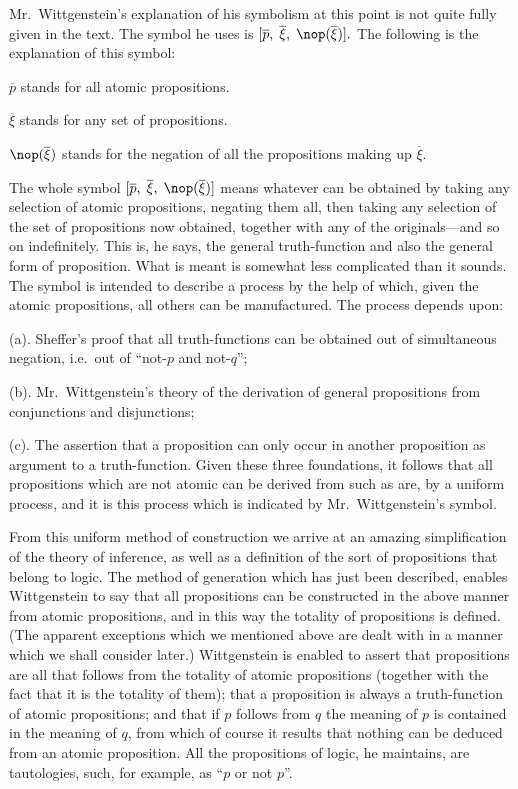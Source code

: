 Mr.\ Wittgenstein’s explanation of his symbolism at this point is not quite fully given in the text. The symbol he uses is $[\overline{p},\thickspace \overline{\xi},\thickspace \nop(\overline{\xi})].$ The following is the explanation of this symbol:
%
\begin{description}[noitemsep,labelindent=1em,leftmargin=3em,rightmargin=1em]
  \item $\overline{p}$ stands for all atomic propositions.
  \item $\overline{\xi}$ stands for any set of propositions.
  \item $\nop(\overline{\xi})$ stands for the negation of all the propositions making up $\overline{\xi}$.
\end{description}

The whole symbol $[\overline{p},\thickspace \overline{\xi},\thickspace \nop(\overline{\xi})]$ means whatever can be obtained by taking any selection of atomic propositions, negating them all, then taking any selection of the set of propositions now obtained, together with any of the originals—and so on indefinitely. This is, he says, the general truth-function and also the general form of proposition. What is meant is somewhat less complicated than it sounds. The symbol is intended to describe a process by the help of which, given the atomic propositions, all others can be manufactured. The process depends upon:

(a). Sheffer’s proof that all truth-functions can be obtained out of simultaneous negation, i.e.\ out of “not-$p$ and not-$q$”;

(b). Mr.\ Wittgenstein’s theory of the derivation of general propositions from conjunctions and disjunctions;

(c). The assertion that a proposition can only occur in another proposition as argument to a truth-function. Given these three foundations, it follows that all propositions which are not atomic can be derived from such as are, by a uniform process, and it is this process which is indicated by Mr.\ Wittgenstein’s symbol.

From this uniform method of construction we arrive at an amazing simplification of the theory of inference, as well as a definition of the sort of propositions that belong to logic. The method of generation which has just been described, enables Wittgenstein to say that all propositions can be constructed in the above manner from atomic propositions, and in this way the totality of propositions is defined. (The apparent exceptions which we mentioned above are dealt with in a manner which we shall consider later.) Wittgenstein is enabled to assert that propositions are all that follows from the totality of atomic propositions (together with the fact that it is the totality of them); that a proposition is always a truth-function of atomic propositions; and that if $p$ follows from $q$ the meaning of $p$ is contained in the meaning of $q$, from which of course it results that nothing can be deduced from an atomic proposition. All the propositions of logic, he maintains, are tautologies, such, for example, as “$p$ or not $p$”.

